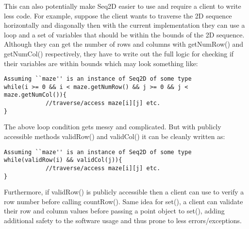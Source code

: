 \documentclass[12pt]{article}
\begin{document}
This can also potentially make Seq2D easier to use and require a client to write less code. For example, suppose the client wants to traverse the 2D sequence horizontally and diagonally then with the current implementation they can use a loop and a set of variables that should be within the bounds of the 2D sequence. Although they can get the number of rows and columns with getNumRow() and getNumCol() respectively, they have to write out the full logic for checking if their variables are within bounds which may look something like:\\
\begin{verbatim}
Assuming ``maze'' is an instance of Seq2D of some type
while(i >= 0 && i < maze.getNumRow() && j >= 0 && j < maze.getNumCol()){
			//traverse/access maze[i][j] etc.
}
\end{verbatim}

The above loop condition gets messy and complicated. But with publicly accessible methods validRow() and validCol() it can be cleanly written as:\\
\begin{verbatim}
Assuming ``maze'' is an instance of Seq2D of some type
while(validRow(i) && validCol(j)){
			//traverse/access maze[i][j] etc.
}
\end{verbatim}

Furthermore, if validRow() is publicly accessible then a client can use to verify a row number before calling countRow(). Same idea for set(), a client can validate their row and column values before passing a point object to set(), adding additional safety to the software usage and thus prone to less errors/exceptions.
\end{document}
